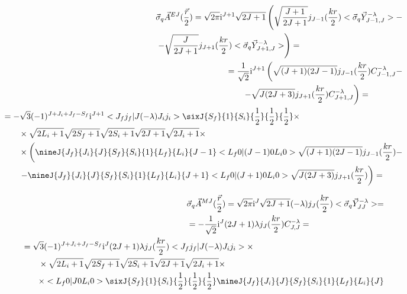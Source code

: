 \begin{align}
    \begin{split}
        &\vec{\sigma}_q \vec{A}^{EJ}(\frac{\vec{r}}{2}) = \sqrt{2\pi} \mathrm{i}^{J+1} \sqrt{2J+1} \left( \sqrt{\frac{J+1}{2J+1}} j_{J-1}(\frac{kr}{2})<\vec{\sigma}_q \vec{Y}^{- \lambda}_{J-1, J}> - \right.\\
        &\left. -\sqrt{\frac{J}{2J+1}} j_{J+1}(\frac{kr}{2}) <\vec{\sigma}_q \vec{Y}_{J+1, J}^{- \lambda}> \right) =
    \end{split}\\
    \begin{split}
        &= \frac{1}{\sqrt{2}} \mathrm{i}^{J+1} \left( \sqrt{(J+1)(2J-1)} j_{J-1}(\frac{kr}{2}) C_{J-1, J}^{- \lambda} - \right.\nonumber \\
        &\qquad \left.- \sqrt{J(2J+3)} j_{J+1}(\frac{kr}{2}) C_{J+1, J}^{- \lambda} \right) =
    \end{split}\\
    \begin{split}
        &= -\sqrt{3} (-1)^{J + J_i + J_f - S_f} \mathrm{i}^{J+1} <J_f j_f| J (-\lambda) J_i j_i> \sixJ{S_f}{1}{S_i}{\frac{1}{2}}{\frac{1}{2}}{\frac{1}{2}} \times \\
        &\qquad\times \sqrt{2L_i+1} \sqrt{2S_f+1} \sqrt{2S_i + 1} \sqrt{2J+1} \sqrt{2J_i+1} \times \\
        &\qquad\times \left( \nineJ{J_f}{J_i}{J}{S_f}{S_i}{1}{L_f}{L_i}{J-1} <L_f 0 | (J-1) 0 L_i 0> \sqrt{(J+1)(2J-1)} j_{J-1}(\frac{kr}{2}) - \right.\nonumber \\
        &\qquad \left.- \nineJ{J_f}{J_i}{J}{S_f}{S_i}{1}{L_f}{L_i}{J+1} <L_f 0 | (J+1) 0 L_i 0> \sqrt{J(2J+3)} j_{J+1}(\frac{kr}{2}) \right) =
    \end{split}\\
\end{align}

\begin{align}
    \begin{split}
        &\vec{\sigma}_q \vec{A}^{MJ}(\frac{\vec{r}}{2}) = \sqrt{2\pi }\mathrm{i}^J \sqrt{2J + 1} (- \lambda) j_J(\frac{kr}{2}) <\vec{\sigma}_q \vec{Y}^{- \lambda}_{JJ}> = \\
        &= -\frac{1}{\sqrt{2}} \mathrm{i}^J (2J + 1) \lambda j_J(\frac{kr}{2}) C_{J, J}^{- \lambda} =
    \end{split}\\
    \begin{split}
        &= \sqrt{3} (-1)^{J + J_i + J_f - S_f} \mathrm{i}^J (2J + 1) \lambda j_J(\frac{kr}{2}) <J_f j_f| J (-\lambda) J_i j_i> \times \\
        &\qquad\times \sqrt{2L_i+1} \sqrt{2S_f+1} \sqrt{2S_i + 1} \sqrt{2J+1} \sqrt{2J_i+1} \times \\
        &\qquad\times <L_f 0 | J 0 L_i 0> \sixJ{S_f}{1}{S_i}{\frac{1}{2}}{\frac{1}{2}}{\frac{1}{2}} \nineJ{J_f}{J_i}{J}{S_f}{S_i}{1}{L_f}{L_i}{J}
    \end{split}
\end{align}

